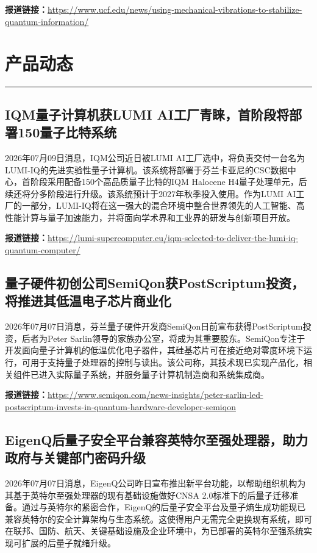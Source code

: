 \documentclass[12pt,a4paper]{ctexart}
\begin{document}
\noindent\textbf{报道链接：}\url{https://www.ucf.edu/news/using-mechanical-vibrations-to-stabilize-quantum-information/}


\newpage
\section{产品动态}
\vspace{-0.5em}
\noindent\rule{\linewidth}{1.5pt}

\subsection{ IQM量子计算机获LUMI AI工厂青睐，首阶段将部署150量子比特系统 }

2026年07月09日消息，IQM公司近日被LUMI AI工厂选中，将负责交付一台名为LUMI-IQ的先进实验性量子计算机。该系统将部署于芬兰卡亚尼的CSC数据中心，首阶段采用配备150个高品质量子比特的IQM Halocene H4量子处理单元，后续还将分多阶段进行升级。该系统预计于2027年秋季投入使用。作为LUMI AI工厂的一部分，LUMI-IQ将在这一强大的混合环境中整合世界领先的人工智能、高性能计算与量子加速能力，并将面向学术界和工业界的研发与创新项目开放。

\noindent\textbf{报道链接：}\url{https://lumi-supercomputer.eu/iqm-selected-to-deliver-the-lumi-iq-quantum-computer/}

\subsection{ 量子硬件初创公司SemiQon获PostScriptum投资，将推进其低温电子芯片商业化 }

2026年07月07日消息，芬兰量子硬件开发商SemiQon日前宣布获得PostScriptum投资，后者为Peter Sarlin领导的家族办公室，将成为其重要股东。SemiQon专注于开发面向量子计算机的低温优化电子器件，其硅基芯片可在接近绝对零度环境下运行，可用于支持量子处理器的控制与读出。该公司称，其技术现已实现产品化，相关组件已进入实际量子系统，并服务量子计算机制造商和系统集成商。

\noindent\textbf{报道链接：}\url{https://www.semiqon.com/news-insights/peter-sarlin-led-postscriptum-invests-in-quantum-hardware-developer-semiqon}

\subsection{ EigenQ后量子安全平台兼容英特尔至强处理器，助力政府与关键部门密码升级 }

2026年07月07日消息，EigenQ公司昨日宣布推出新平台功能，以帮助组织机构为其基于英特尔至强处理器的现有基础设施做好CNSA 2.0标准下的后量子迁移准备。通过与英特尔的紧密合作，EigenQ的后量子安全平台及量子熵生成功能现已兼容英特尔的安全计算架构与生态系统。这使得用户无需完全更换现有系统，即可在联邦、国防、航天、关键基础设施及企业环境中，为已部署的英特尔至强系统实现可扩展的后量子就绪升级。
\end{document}

